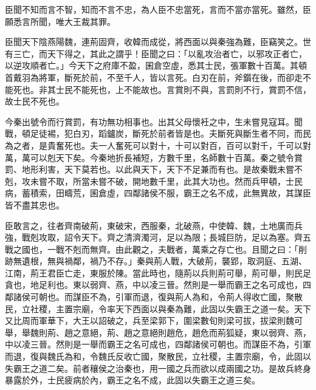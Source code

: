 
\begin{pinyinscope}
臣聞不知而言不智，知而不言不忠，為人臣不忠當死，言而不當亦當死。雖然，臣願悉言所聞，唯大王裁其罪。

臣聞天下陰燕陽魏，連荊固齊，收韓而成從，將西面以與秦強為難，臣竊笑之。世有三亡，而天下得之，其此之謂乎！臣聞之曰：「以亂攻治者亡，以邪攻正者亡，以逆攻順者亡。」今天下之府庫不盈，囷倉空虛，悉其士民，張軍數十百萬。其頓首戴羽為將軍，斷死於前，不至千人，皆以言死。白刃在前，斧鑕在後，而卻走不能死也。非其士民不能死也，上不能故也。言賞則不與，言罰則不行，賞罰不信，故士民不死也。

今秦出號令而行賞罰，有功無功相事也。出其父母懷衽之中，生未嘗見寇耳。聞戰，頓足徒裼，犯白刃，蹈鑪炭，斷死於前者皆是也。夫斷死與斷生者不同，而民為之者，是貴奮死也。夫一人奮死可以對十，十可以對百，百可以對千，千可以對萬，萬可以剋天下矣。今秦地折長補短，方數千里，名師數十百萬。秦之號令賞罰、地形利害，天下莫若也。以此與天下，天下不足兼而有也。是故秦戰未嘗不剋，攻未嘗不取，所當未嘗不破，開地數千里，此其大功也。然而兵甲頓，士民病，蓄積索，田疇荒，囷倉虛，四鄰諸侯不服，霸王之名不成，此無異故，其謀臣皆不盡其忠也。

臣敢言之，往者齊南破荊，東破宋，西服秦，北破燕，中使韓、魏，土地廣而兵強，戰剋攻取，詔令天下。齊之清濟濁河，足以為限；長城巨防，足以為塞。齊五戰之國也，一戰不剋而無齊。由此觀之，夫戰者，萬乘之存亡也。且聞之曰：「削跡無遺根，無與禍鄰，禍乃不存。」秦與荊人戰，大破荊，襲郢，取洞庭、五湖、江南，荊王君臣亡走，東服於陳。當此時也，隨荊以兵則荊可舉，荊可舉，則民足貪也，地足利也。東以弱齊、燕，中以凌三晉。然則是一舉而霸王之名可成也，四鄰諸侯可朝也。而謀臣不為，引軍而退，復與荊人為和，令荊人得收亡國，聚散民，立社稷，主置宗廟，令率天下西面以與秦為難，此固以失霸王之道一矣。天下又比周而軍華下，大王以詔破之，兵至梁郭下，圍梁數旬則梁可拔，拔梁則魏可舉，舉魏則荊、趙之意絕，荊、趙之意絕則趙危，趙危而荊狐疑，東以弱齊、燕，中以凌三晉。然則是一舉而霸王之名可成也，四鄰諸侯可朝也。而謀臣不為，引軍而退，復與魏氏為和，令魏氏反收亡國，聚散民，立社稷，主置宗廟，令，此固以失霸王之道二矣。前者穰侯之治秦也，用一國之兵而欲以成兩國之功。是故兵終身暴露於外，士民疲病於內，霸王之名不成，此固以失霸王之道三矣。


\end{pinyinscope}
